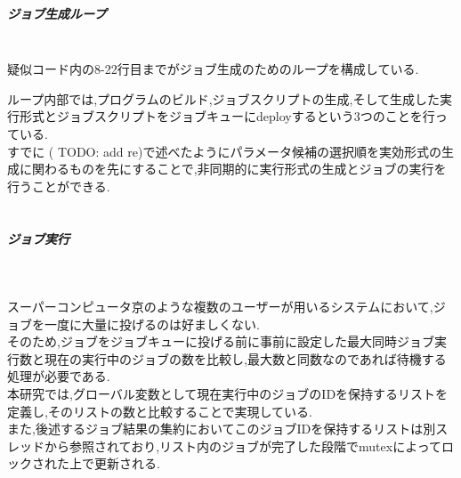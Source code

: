 \subparagraph{ジョブ生成ループ}~\\
疑似コード内の8-22行目までがジョブ生成のためのループを構成している.\\
{\footnotesize

}
ループ内部では,プログラムのビルド,ジョブスクリプトの生成,そして生成した実行形式とジョブスクリプトをジョブキューにdeployするという3つのことを行っている.\\
すでに ( TODO: add re)で述べたようにパラメータ候補の選択順を実効形式の生成に関わるものを先にすることで,非同期的に実行形式の生成とジョブの実行を行うことができる.\\
\\
\subparagraph{ジョブ実行}~\\
{\footnotesize

}
スーパーコンピュータ京のような複数のユーザーが用いるシステムにおいて,ジョブを一度に大量に投げるのは好ましくない.\\
そのため,ジョブをジョブキューに投げる前に事前に設定した最大同時ジョブ実行数と現在の実行中のジョブの数を比較し,最大数と同数なのであれば待機する処理が必要である.\\
本研究では,グローバル変数として現在実行中のジョブのIDを保持するリストを定義し,そのリストの数と比較することで実現している.\\
また,後述するジョブ結果の集約においてこのジョブIDを保持するリストは別スレッドから参照されており,リスト内のジョブが完了した段階でmutexによってロックされた上で更新される.\\
